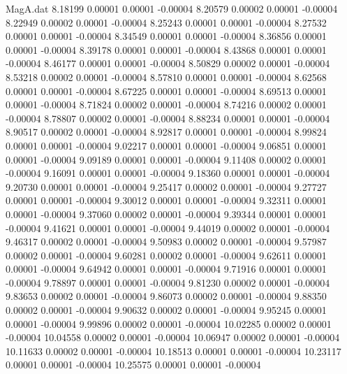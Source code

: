 \begin{filecontents}{MagA.dat}
   8.18199    0.00001    0.00001   -0.00004
   8.20579    0.00002    0.00001   -0.00004
   8.22949    0.00002    0.00001   -0.00004
   8.25243    0.00001    0.00001   -0.00004
   8.27532    0.00001    0.00001   -0.00004
   8.34549    0.00001    0.00001   -0.00004
   8.36856    0.00001    0.00001   -0.00004
   8.39178    0.00001    0.00001   -0.00004
   8.43868    0.00001    0.00001   -0.00004
   8.46177    0.00001    0.00001   -0.00004
   8.50829    0.00002    0.00001   -0.00004
   8.53218    0.00002    0.00001   -0.00004
   8.57810    0.00001    0.00001   -0.00004
   8.62568    0.00001    0.00001   -0.00004
   8.67225    0.00001    0.00001   -0.00004
   8.69513    0.00001    0.00001   -0.00004
   8.71824    0.00002    0.00001   -0.00004
   8.74216    0.00002    0.00001   -0.00004
   8.78807    0.00002    0.00001   -0.00004
   8.88234    0.00001    0.00001   -0.00004
   8.90517    0.00002    0.00001   -0.00004
   8.92817    0.00001    0.00001   -0.00004
   8.99824    0.00001    0.00001   -0.00004
   9.02217    0.00001    0.00001   -0.00004
   9.06851    0.00001    0.00001   -0.00004
   9.09189    0.00001    0.00001   -0.00004
   9.11408    0.00002    0.00001   -0.00004
   9.16091    0.00001    0.00001   -0.00004
   9.18360    0.00001    0.00001   -0.00004
   9.20730    0.00001    0.00001   -0.00004
   9.25417    0.00002    0.00001   -0.00004
   9.27727    0.00001    0.00001   -0.00004
   9.30012    0.00001    0.00001   -0.00004
   9.32311    0.00001    0.00001   -0.00004
   9.37060    0.00002    0.00001   -0.00004
   9.39344    0.00001    0.00001   -0.00004
   9.41621    0.00001    0.00001   -0.00004
   9.44019    0.00002    0.00001   -0.00004
   9.46317    0.00002    0.00001   -0.00004
   9.50983    0.00002    0.00001   -0.00004
   9.57987    0.00002    0.00001   -0.00004
   9.60281    0.00002    0.00001   -0.00004
   9.62611    0.00001    0.00001   -0.00004
   9.64942    0.00001    0.00001   -0.00004
   9.71916    0.00001    0.00001   -0.00004
   9.78897    0.00001    0.00001   -0.00004
   9.81230    0.00002    0.00001   -0.00004
   9.83653    0.00002    0.00001   -0.00004
   9.86073    0.00002    0.00001   -0.00004
   9.88350    0.00002    0.00001   -0.00004
   9.90632    0.00002    0.00001   -0.00004
   9.95245    0.00001    0.00001   -0.00004
   9.99896    0.00002    0.00001   -0.00004
  10.02285    0.00002    0.00001   -0.00004
  10.04558    0.00002    0.00001   -0.00004
  10.06947    0.00002    0.00001   -0.00004
  10.11633    0.00002    0.00001   -0.00004
  10.18513    0.00001    0.00001   -0.00004
  10.23117    0.00001    0.00001   -0.00004
  10.25575    0.00001    0.00001   -0.00004

\end{filecontents}
